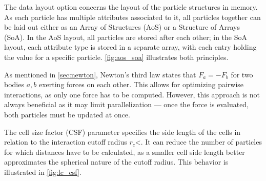 \begin{description}[leftmargin=!,labelwidth=\widthof{\textbf{Cell Size Factor}}]
	\item[\textbf{Data Layout}] The data layout option concerns the layout of the particle structures in memory. As each particle has multiple attributes associated to it, all particles together can be laid out either as an Array of Structures (AoS) or a Structure of Arrays (SoA). In the AoS layout, all particles are stored after each other; in the SoA layout, each attribute type is stored in a separate array, with each entry holding the value for a specific particle. \autoref{fig:aos_soa} illustrates both principles.
	\item[\textbf{Newton3}] As mentioned in \autoref{sec:newton}, Newton's third law states that $F_a = -F_b$ for two bodies $a, b$ exerting forces on each other. This allows for optimizing pairwise interactions, as only one force has to be computed. However, this approach is not always beneficial as it may limit parallelization --- once the force is evaluated, both particles must be updated at once.
	\item[\textbf{Cell Size Factor}] The cell size factor (CSF) parameter specifies the side length of the cells in relation to the interaction cutoff radius $r_c$<. It can reduce the number of particles for which distances have to be calculated, as a smaller cell side length better approximates the spherical nature of the cutoff radius. This behavior is illustrated in  \autoref{fig:lc_csf}.
\end{description}


